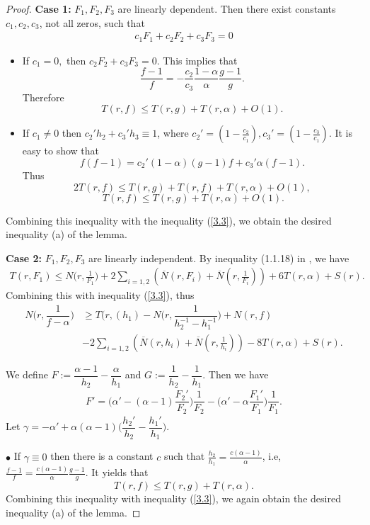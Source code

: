 \documentclass[10pt,a4paper]{amsart}
\begin{document}
\begin{proof}
\textbf{Case 1:} $F_1,F_2,F_3$ are linearly dependent. Then there exist constants $c_1,c_2,c_3$, not all zeros, such that
\begin{align*}
    c_1F_1+c_2F_2+c_3F_3=0
\end{align*}
\begin{itemize}
    \item If $c_1 =0,$ then $c_2F_2+c_3F_3=0$. This implies that 
		$$\frac{f-1}{f}=-\frac{c_2}{c_3}\frac{1-\alpha}{\alpha}\frac{g-1}{g}.$$
		Therefore
		$$T(r,f)\le T(r,g)+T(r,\alpha)+O(1).$$
	\item If $c_1\neq 0$ then $c_2'h_2+c_3'h_3\equiv 1$, where $\displaystyle c_2'=(1-\frac{c_2}{c_1}),c_3'=(1-\frac{c_3}{c_1}).$
		It is easy to show that
		$$f(f-1)=c_2'(1-\alpha)(g-1)f+c_3'\alpha(f-1).$$
		Thus
		$$2T(r,f)\le T(r,g)+T(r,f)+T(r,\alpha)+O(1),$$
		$$\ T(r,f)\le T(r,g)+T(r,\alpha)+O(1).$$
\end{itemize}     
Combining this inequality with the inequality (\ref{3.3}), we obtain the desired inequality (a) of the lemma.

\textbf{Case 2:} $F_1,F_2,F_3$ are linearly independent. By inequality (1.1.18) in \cite[Lemma 1.102]{PPC}, we have
 \begin{align*}
			T(r,F_1)\le N\Big(r,\frac{1}{F_1}\Big)+2\sum_{i=1,2}\left(\overline{N}(r,F_i)+\overline{N}(r,\frac{1}{F_i})\right)+6T(r,\alpha)+S(r).
\end{align*}
Combining this with inequality (\ref{3.3}), thus
\begin{align*}
			N\Big(r,\dfrac{1}{f-\alpha}\Big)&\ge T(r,(h_1)-N\Big(r,\dfrac{1}{h_2^{-1}-h_1^{-1}}\Big)+N(r,f)\\
			&-2\sum_{i=1,2}\left(\overline{N}(r,h_i)+\overline{N}(r,\frac{1}{h_i})\right)-8T(r,\alpha)+S(r).
\end{align*}	

We define $F:=\dfrac{\alpha-1}{h_2}-\dfrac{\alpha}{h_1}$ and $G:=\dfrac{1}{h_2}-\dfrac{1}{h_1}$. Then we have 
\begin{align}\label{3.13}
F'=\Big(\alpha'-(\alpha-1)\dfrac{F_2'}{F_2}\Big)\dfrac{1}{F_2}-\Big(\alpha'-\alpha\dfrac{F_1'}{F_1}\Big)\dfrac{1}{F_1}.
\end{align}
Let $\gamma=-\alpha'+\alpha(\alpha-1)\Big(\dfrac{h_2'}{h_2}-\dfrac{h_1'}{h_1}\Big).$

$\bullet$  If $\gamma\equiv 0$ then there is a constant $c$ such that
		$\frac{h_2}{h_1}=\frac{c(\alpha-1)}{\alpha}$, i.e, $\frac{f-1}{f}=\frac{c(\alpha-1)}{\alpha}\frac{g-1}{g}$. It yields that
		$$T(r,f)\le T(r,g)+T(r,\alpha).$$
		Combining this inequality with inequality (\ref{3.3}), we again obtain the desired inequality (a) of the lemma.


\end{proof}
\end{document}

